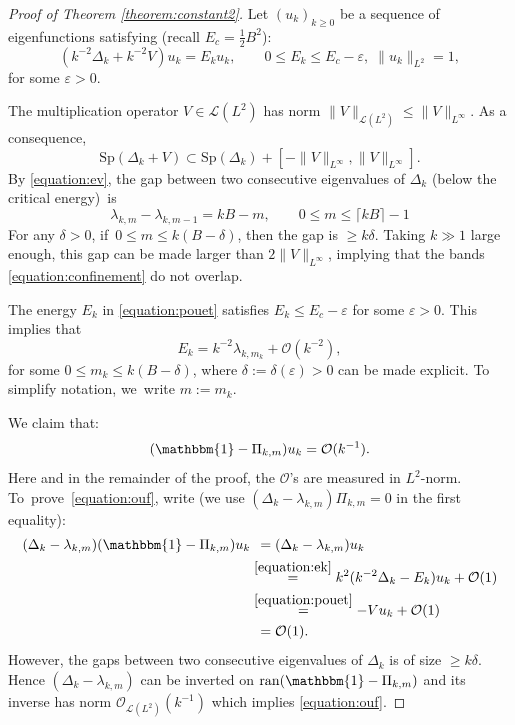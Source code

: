 \documentclass[10pt]{amsart}
\theoremstyle{plain}
\theoremstyle{definition}
\let\mc\mathcal
\let\eps\varepsilon
\DeclareMathOperator{\ran}{ran}
\newcommand{\bigo}{\mathcal{O}}
\begin{document}
\begin{proof}[Proof of Theorem \ref{theorem:constant2}]
Let $(u_k)_{k \geq 0}$ be a sequence of eigenfunctions satisfying (recall $E_c=\tfrac{1}{2}B^2$):
\begin{equation}
\label{equation:pouet}
(k^{-2}\Delta_k + k^{-2}V) u_k = E_k u_k, \qquad 0 \leq E_k \leq E_c -\eps,
\; \|u_k\|_{L^2}=1,
\end{equation}
for some $\eps > 0$.

The multiplication operator $V \in \mc{L}(L^2)$ has norm $\|V\|_{\mc{L}(L^2) } \leq \|V\|_{L^\infty}$. As a consequence,
\begin{equation}
\label{equation:confinement}
\mathrm{Sp}(\Delta_k + V) \subset \mathrm{Sp}(\Delta_k) + [-\|V\|_{L^\infty},\|V\|_{L^\infty}].
\end{equation}
By \eqref{equation:ev}, the gap between two consecutive eigenvalues of $\Delta_k$ (below the critical energy)~is
\[
\lambda_{k,m}-\lambda_{k,m-1} = kB-m, \qquad 0 \leq m \leq \lceil kB\rceil - 1
\]
For any $\delta > 0$, if~$0 \leq m \leq k(B-\delta)$, then the gap is $\geq
k\delta $. Taking $k \gg 1$ large enough, this gap can be made larger than $2\|V\|_{L^\infty}$, implying that the bands \eqref{equation:confinement} do not overlap.

The energy $E_k$ in \eqref{equation:pouet} satisfies $E_k \leq E_c-\eps$ for some $\eps > 0$. This implies that
\begin{equation}
\label{equation:ek}
E_k = k^{-2}\lambda_{k,m_k} + \mc{O}(k^{-2}),
\end{equation}
for some $0 \leq m_k \leq k(B -\delta)$, where $\delta := \delta(\eps) > 0$ can be made explicit. To simplify notation, we~write $m:=m_k$.

We claim that:\vspace*{-3pt}
\begin{equation}
\label{equation:ouf}
(\mathbbm{1}-\Pi_{k,m}) u_k = \mc{O}(k^{-1}).
\end{equation}
Here and in the remainder of the proof, the $\bigo$'s are measured in
$L^2$-norm. To~prove~\eqref{equation:ouf}, write (we use $(\Delta_{k} -\lambda_{k,m})\Pi_{k,m} =0$ in the first equality):
\[
\begin{split}
(\Delta_{k} -\lambda_{k,m})(\mathbbm{1}-\Pi_{k,m})u_k &\;\,= (\Delta_{k}
-\lambda_{k,m})u_k \\
& \overset{\eqref{equation:ek}}{=} k^{2}(k^{-2}\Delta_k- E_k) u_k + \mc{O}(1) \\
& \overset{\eqref{equation:pouet}}{=} - V u_k + \mc{O}(1) \\
&\;\,= \mc{O}(1).
\end{split}
\]
However, the gaps between two consecutive eigenvalues of $\Delta_k$ is of size
$\geq k\delta $. Hence $(\Delta_{k} -\lambda_{k,m})$ can be inverted on
$\ran(\mathbbm{1}-\Pi_{k,m})$ and its inverse has norm $\mc{O}_{\mc{L}(L^2)}(k^{-1})$ which implies \eqref{equation:ouf}.


\end{proof}
\end{document}

